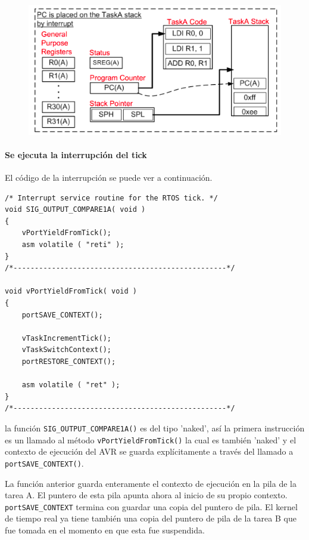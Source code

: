 \begin{figure}[H]
    \centering
    \includegraphics[scale=0.7]{RTOS/f6.PNG}
\end{figure}

\paragraph{Se ejecuta la interrupción del tick}

El código de la interrupción se puede ver a continuación.

\begin{verbatim}
/* Interrupt service routine for the RTOS tick. */
void SIG_OUTPUT_COMPARE1A( void )
{
    vPortYieldFromTick();
    asm volatile ( "reti" );
}
/*--------------------------------------------------*/

void vPortYieldFromTick( void )
{
    portSAVE_CONTEXT();

    vTaskIncrementTick();
    vTaskSwitchContext();
    portRESTORE_CONTEXT();

    asm volatile ( "ret" );
}
/*--------------------------------------------------*/
\end{verbatim}

la función \texttt{SIG\_OUTPUT\_COMPARE1A()} es del tipo 'naked', así la primera instrucción es un llamado al método \texttt{vPortYieldFromTick()} la cual es también 'naked' y el contexto de ejecución del AVR se guarda explícitamente a través del llamado a \texttt{portSAVE\_CONTEXT()}.

La función anterior guarda enteramente el contexto de ejecución en la pila de la tarea A. El puntero de esta pila apunta ahora al inicio de su propio contexto. \texttt{portSAVE\_CONTEXT} termina con guardar una copia del puntero de pila. El kernel de tiempo real ya tiene también una copia del puntero de pila de la tarea B que fue tomada en el momento en que esta fue suspendida.


